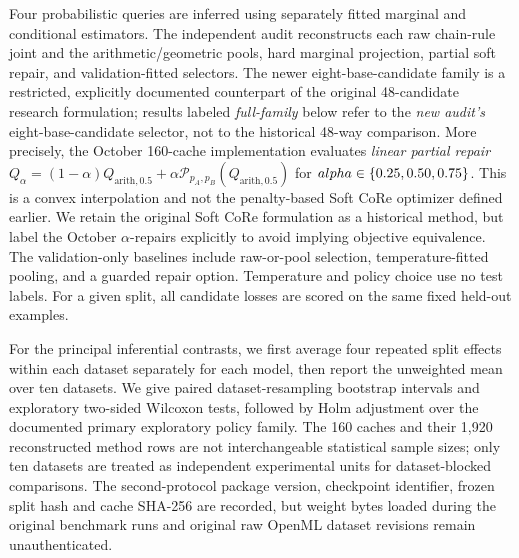 \documentclass[a4paper,fleqn]{cas-sc}
\begin{document}
Four probabilistic queries are inferred using separately fitted marginal and conditional estimators. The independent audit reconstructs each raw chain-rule joint and the arithmetic/geometric pools, hard marginal projection, partial soft repair, and validation-fitted selectors. The newer eight-base-candidate family is a restricted, explicitly documented counterpart of the original 48-candidate research formulation; results labeled \emph{full-family} below refer to the \emph{new audit's} eight-base-candidate selector, not to the historical 48-way comparison. More precisely, the October 160-cache implementation evaluates \emph{linear partial repair} $Q_{\alpha}=(1-\alpha)Q_{\mathrm{arith},0.5}+\alpha\mathcal{P}_{p_A,p_B}(Q_{\mathrm{arith},0.5})$ for $\\alpha\in\{0.25,0.50,0.75\}$. This is a convex interpolation and not the penalty-based Soft CoRe optimizer defined earlier. We retain the original Soft CoRe formulation as a historical method, but label the October $\alpha$-repairs explicitly to avoid implying objective equivalence. The validation-only baselines include raw-or-pool selection, temperature-fitted pooling, and a guarded repair option. Temperature and policy choice use no test labels. For a given split, all candidate losses are scored on the same fixed held-out examples.

For the principal inferential contrasts, we first average four repeated split effects within each dataset separately for each model, then report the unweighted mean over ten datasets. We give paired dataset-resampling bootstrap intervals and exploratory two-sided Wilcoxon tests, followed by Holm adjustment over the documented primary exploratory policy family. The 160 caches and their 1,920 reconstructed method rows are not interchangeable statistical sample sizes; only ten datasets are treated as independent experimental units for dataset-blocked comparisons. The second-protocol package version, checkpoint identifier, frozen split hash and cache SHA-256 are recorded, but weight bytes loaded during the original benchmark runs and original raw OpenML dataset revisions remain unauthenticated.
\end{document}
